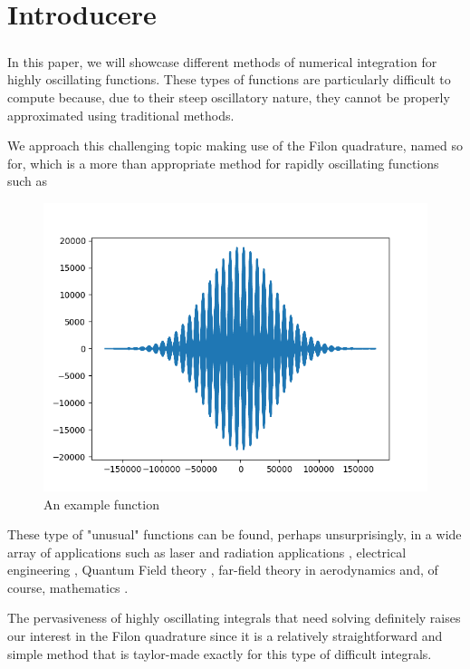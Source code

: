 \chapter{Introducere}

\paragraph{} In this paper, we will showcase different methods of numerical integration for highly oscillating functions. These types of functions are particularly difficult to compute because, due to their steep oscillatory nature, they cannot be properly approximated using traditional methods.

We approach this challenging topic making use of the Filon quadrature, named so for, which is a more than appropriate method for rapidly oscillating functions such as
\begin{figure}[h]
    \centering
    \includegraphics[scale=0.7]{c1/Figure_1.png}
    \caption{An example function}
    \label{fig:my_label}
\end{figure}

These type of "unusual" functions can be found, perhaps unsurprisingly, in a wide array of applications such as laser and radiation applications \cite{book1}, electrical engineering \cite{circ} \cite{circ2}, Quantum Field theory \cite{world}, far-field theory in aerodynamics\cite{aer} and, of course, mathematics\cite{rules} \cite{fcc} \cite{comp}. 

The pervasiveness of highly oscillating integrals that need solving definitely raises our interest in the Filon quadrature since it is a relatively straightforward and simple method that is taylor-made exactly for this type of difficult integrals.%
